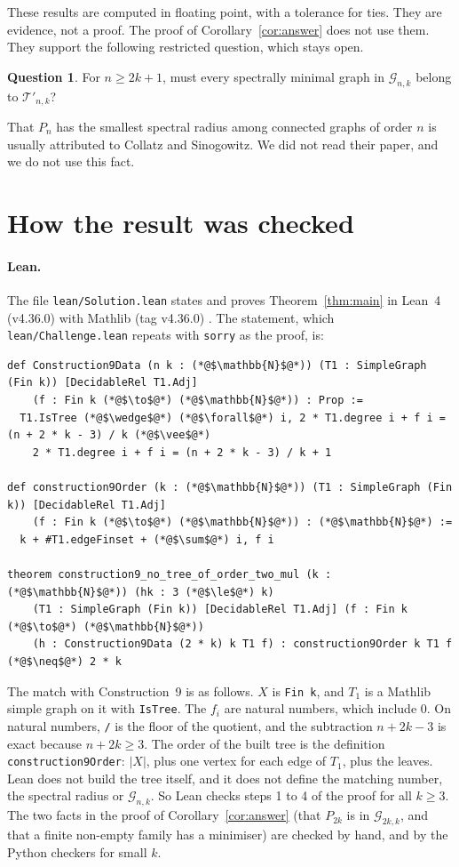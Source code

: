 \documentclass[11pt]{article}
\theoremstyle{definition}
\newtheorem{question}[theorem]{Question}
\newcommand{\G}{\mathcal{G}}
\newcommand{\Tp}{\mathcal{T}'}
\begin{document}
These results are computed in floating point, with a tolerance for ties. They are
evidence, not a proof. The proof of Corollary~\ref{cor:answer} does not use them. They
support the following restricted question, which stays open.

\begin{question}
For $n \ge 2k+1$, must every spectrally minimal graph in $\G_{n,k}$ belong to $\Tp_{n,k}$?
\end{question}

That $P_n$ has the smallest spectral radius among connected graphs of order $n$ is
usually attributed to Collatz and Sinogowitz. We did not read their paper, and we do not
use this fact.

\section{How the result was checked}\label{sec:checks}

\paragraph{Lean.}
The file \texttt{lean/Solution.lean} states and proves Theorem~\ref{thm:main} in Lean~4
(v4.36.0) with Mathlib (tag v4.36.0) \cite{lean}. The statement, which \texttt{lean/Challenge.lean}
repeats with \texttt{sorry} as the proof, is:

\begin{lstlisting}
def Construction9Data (n k : (*@$\mathbb{N}$@*)) (T1 : SimpleGraph (Fin k)) [DecidableRel T1.Adj]
    (f : Fin k (*@$\to$@*) (*@$\mathbb{N}$@*)) : Prop :=
  T1.IsTree (*@$\wedge$@*) (*@$\forall$@*) i, 2 * T1.degree i + f i = (n + 2 * k - 3) / k (*@$\vee$@*)
    2 * T1.degree i + f i = (n + 2 * k - 3) / k + 1

def construction9Order (k : (*@$\mathbb{N}$@*)) (T1 : SimpleGraph (Fin k)) [DecidableRel T1.Adj]
    (f : Fin k (*@$\to$@*) (*@$\mathbb{N}$@*)) : (*@$\mathbb{N}$@*) :=
  k + #T1.edgeFinset + (*@$\sum$@*) i, f i

theorem construction9_no_tree_of_order_two_mul (k : (*@$\mathbb{N}$@*)) (hk : 3 (*@$\le$@*) k)
    (T1 : SimpleGraph (Fin k)) [DecidableRel T1.Adj] (f : Fin k (*@$\to$@*) (*@$\mathbb{N}$@*))
    (h : Construction9Data (2 * k) k T1 f) : construction9Order k T1 f (*@$\neq$@*) 2 * k
\end{lstlisting}

\noindent The match with Construction~9 is as follows. $X$ is \texttt{Fin k}, and
$T_1$ is a Mathlib simple graph on it with \texttt{IsTree}. The $f_i$ are natural numbers,
which include 0. On natural numbers, \texttt{/} is the floor of the quotient, and the
subtraction $n + 2k - 3$ is exact because $n + 2k \ge 3$. The order of the built tree is
the definition \texttt{construction9Order}: $|X|$, plus one vertex for each edge of $T_1$,
plus the leaves. Lean does not build the tree itself, and it does not define the matching
number, the spectral radius or $\G_{n,k}$. So Lean checks steps 1 to 4 of the proof for
all $k \ge 3$. The two facts in the proof of Corollary~\ref{cor:answer} (that $P_{2k}$ is
in $\G_{2k,k}$, and that a finite non-empty family has a minimiser) are checked by hand,
and by the Python checkers for small $k$.
\end{document}

